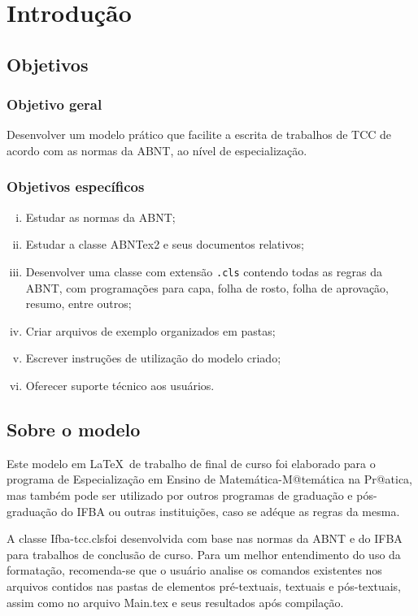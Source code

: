 %
%

\chapter{Introdução}\label{chap:introducao}
\section{Objetivos}
\subsection{Objetivo geral}
Desenvolver um modelo prático que facilite a escrita de trabalhos de TCC de acordo com as normas da ABNT, ao nível de especialização.
\subsection{Objetivos específicos}
\begin{enumerate}[(i)]
\item Estudar as normas da ABNT;
\item Estudar a classe ABNTex2 e seus documentos relativos;
\item Desenvolver uma classe com extensão \verb+.cls+ contendo todas as regras da ABNT, com programações para capa, folha de rosto, folha de aprovação, resumo, entre outros;
\item Criar arquivos de exemplo organizados em pastas;
\item Escrever instruções de utilização do modelo criado;
\item Oferecer suporte técnico aos usuários.
\end{enumerate}
\section{Sobre o modelo}
Este modelo em \LaTeX \ de trabalho de final de curso foi elaborado para o programa de Especialização em Ensino de Matemática-M@temática na Pr@atica, mas também pode ser utilizado por outros programas de graduação e pós-graduação do IFBA ou  outras instituições, caso se adéque as regras da mesma.

A classe {\ttfamily Ifba-tcc.cls}foi desenvolvida com base nas normas da ABNT e do IFBA para trabalhos de conclusão de curso. Para um melhor entendimento do uso da formatação, recomenda-se que o usuário analise os comandos existentes nos arquivos contidos nas pastas de elementos pré-textuais, textuais e pós-textuais, assim como no arquivo {\ttfamily Main.tex} e seus resultados após compilação. 

